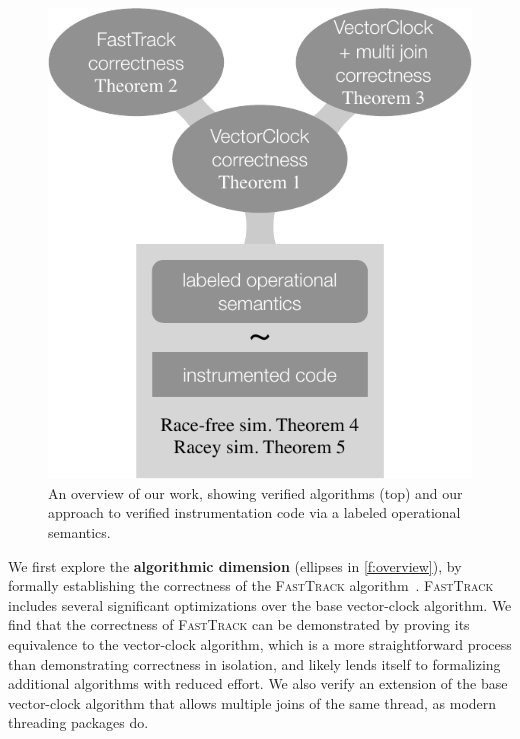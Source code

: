 \documentclass[preprint, 10pt]{sigplanconf}
\newcommand{\ignore}[1]{}
\newcommand{\FT}{\textsc{FastTrack}\xspace}
\begin{document}
\begin{figure}[t]
\centering
 \includegraphics[width=0.6\columnwidth]{overview.pdf}
 \caption{An overview of our work, showing verified algorithms (top) and our approach to verified instrumentation code via a labeled operational semantics.}
 \label{f:overview}
\end{figure}

We first explore the \textbf{algorithmic dimension} (ellipses in \autoref{f:overview}), by formally establishing the correctness of the \FT algorithm~\cite{fasttrack}. \FT includes several significant optimizations over the base vector-clock algorithm. We find that the correctness of \FT can be demonstrated by proving its equivalence to the vector-clock algorithm, which is a more straightforward process than demonstrating correctness in isolation, and likely lends itself to formalizing additional algorithms with reduced effort. \ignore{Our verification efforts have revealed a small issue in the paper proof that, while fixable, illustrates the potential dangers that stem from best-effort proofs. We have repaired this issue in our proof of \FT, establishing that the algorithm is correct.} We also verify an extension of the base vector-clock algorithm that allows multiple joins of the same thread, as modern threading packages do.
\end{document}
